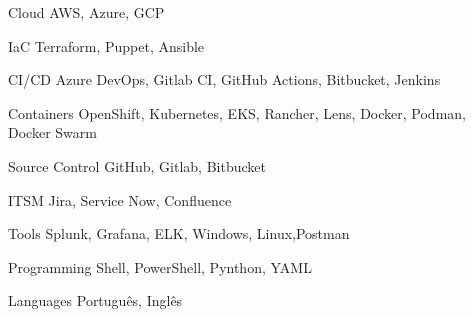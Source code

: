 

\begin{cvskills}

  \cvskill
    {Cloud} %
    {AWS, Azure, GCP} %

  \cvskill
    {IaC} %
    {Terraform, Puppet, Ansible} %

  \cvskill
    {CI/CD} %
    {Azure DevOps, Gitlab CI, GitHub Actions, Bitbucket, Jenkins} %

  \cvskill
    {Containers} %
    {OpenShift, Kubernetes, EKS, Rancher, Lens, Docker, Podman, Docker Swarm} %

  \cvskill
    {Source Control} %
    {GitHub, Gitlab, Bitbucket} %

  \cvskill
    {ITSM} %
    {Jira, Service Now, Confluence} %

  \cvskill
    {Tools} %
    {Splunk, Grafana, ELK, Windows, Linux,Postman} %

  \cvskill
    {Programming} %
    {Shell, PowerShell, Pynthon, YAML} %

  \cvskill
    {Languages} %
    {Português, Inglês} %

\end{cvskills}